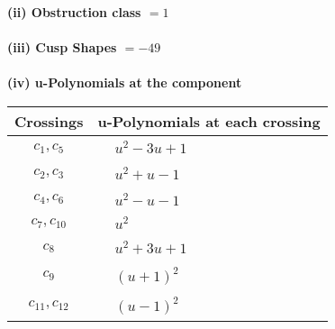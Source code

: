 \documentclass[1p]{elsarticle_modified}
\theoremstyle{definition}
\begin{document}
\flushleft \textbf{(ii) Obstruction class $= 1$}\\~\\
\flushleft \textbf{(iii) Cusp Shapes $= -49$}\\~\\
\newpage\renewcommand{\arraystretch}{1}
\flushleft \textbf{(iv) u-Polynomials at the component}\newline \\
\begin{tabular}{m{50pt}|m{274pt}}
Crossings & \hspace{64pt}u-Polynomials at each crossing \\
\hline $$\begin{aligned}c_{1},c_{5}\end{aligned}$$&$\begin{aligned}
&u^2-3 u+1
\end{aligned}$\\
\hline $$\begin{aligned}c_{2},c_{3}\end{aligned}$$&$\begin{aligned}
&u^2+u-1
\end{aligned}$\\
\hline $$\begin{aligned}c_{4},c_{6}\end{aligned}$$&$\begin{aligned}
&u^2- u-1
\end{aligned}$\\
\hline $$\begin{aligned}c_{7},c_{10}\end{aligned}$$&$\begin{aligned}
&u^2
\end{aligned}$\\
\hline $$\begin{aligned}c_{8}\end{aligned}$$&$\begin{aligned}
&u^2+3 u+1
\end{aligned}$\\
\hline $$\begin{aligned}c_{9}\end{aligned}$$&$\begin{aligned}
&(u+1)^2
\end{aligned}$\\
\hline $$\begin{aligned}c_{11},c_{12}\end{aligned}$$&$\begin{aligned}
&(u-1)^2
\end{aligned}$\\
\hline
\end{tabular}\\~\\
\end{document}
